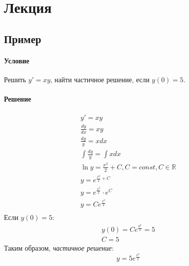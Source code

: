 \section{Лекция}

\subsection{Пример }
\paragraph{Условие}
Решить $y' = xy$, найти частичное решение, если $y(0) = 5$.
\paragraph{Решение}
\begin{gather*}
	y' = xy \\
	\frac{dy}{dx} = xy \\
	\frac{dy}{y} = xdx \\
	\int \frac{dy}{y} = \int xdx \\
	\ln y = \frac{x^2}{2} + C, C = const, C \in \mathbb{R} \\
	y = e^{\frac{x^2}{2} + C} \\
	y = e^{\frac{x^2}{2}} \cdot e^C \\
	y = Ce^{\frac{x^2}{2}} \\
\end{gather*}
Если $y(0) = 5$:
\begin{gather*}
	y(0) = Ce^{\frac{0^2}{2}} = 5 \\
	C = 5
\end{gather*}
Таким образом, \textit{частичное решение}:
\[y = 5e^{\frac{x^2}{2}}\]
